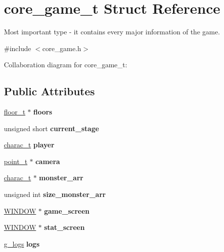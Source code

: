 \hypertarget{structcore__game__t}{}\section{core\+\_\+game\+\_\+t Struct Reference}
\label{structcore__game__t}


Most important type -\/ it contains every major information of the game.  




{\ttfamily \#include $<$core\+\_\+game.\+h$>$}



Collaboration diagram for core\+\_\+game\+\_\+t\+:
\subsection*{Public Attributes}
\begin{DoxyCompactItemize}
\item 
\mbox{\label{structcore__game__t_a7a9dd36dc2cf86ed5df3c74be24da54c}} 
\hyperlink{structfloor__t}{floor\+\_\+t} $\ast$ {\bfseries floors}
\item 
\mbox{\label{structcore__game__t_aa05131c70309a48bf4c3329ece1d60d0}} 
unsigned short {\bfseries current\+\_\+stage}
\item 
\mbox{\label{structcore__game__t_a6ce67bbde29d86476f9059c92be1ec4a}} 
\hyperlink{structcharac__t}{charac\+\_\+t} {\bfseries player}
\item 
\mbox{\label{structcore__game__t_a919473a944438f0095e113dc78c7f30e}} 
\hyperlink{structpoint__t}{point\+\_\+t} $\ast$ {\bfseries camera}
\item 
\mbox{\label{structcore__game__t_af6f9185ba8e082948bdaffbf47c4e222}} 
\hyperlink{structcharac__t}{charac\+\_\+t} $\ast$ {\bfseries monster\+\_\+arr}
\item 
\mbox{\label{structcore__game__t_a82e4dd9bc2f2d1e92eca39e9eb0b1e69}} 
unsigned int {\bfseries size\+\_\+monster\+\_\+arr}
\item 
\mbox{\label{structcore__game__t_a5566f8dfaa42380df06c52c29a8c00f4}} 
\hyperlink{struct__win}{W\+I\+N\+D\+OW} $\ast$ {\bfseries game\+\_\+screen}
\item 
\mbox{\label{structcore__game__t_a5e62c933ec410778922eeed9e7849477}} 
\hyperlink{struct__win}{W\+I\+N\+D\+OW} $\ast$ {\bfseries stat\+\_\+screen}
\item 
\mbox{\label{structcore__game__t_ab3861e3c85ea85843ad9c86264baaa5a}} 
\hyperlink{structg__logs}{g\+\_\+logs} {\bfseries logs}
\end{DoxyCompactItemize}


